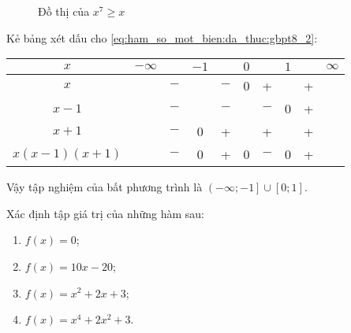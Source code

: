 {\begin{minipageindent}{0.4\textwidth}
\begin{figure}[H]
         \caption{Đồ thị của $x^7 \geq x$}
         \label{fig:ham_so_mot_bien:da_thuc:gbpt8}
      \end{figure}
   \end{minipageindent}
}

Kẻ bảng xét dấu cho \ref{eq:ham_so_mot_bien:da_thuc:gbpt8_2}:
\begin{table}[H]
   \centering
   \begin{tabular}{|c|ccccccccc|}
      \hline
      $x$           & $-\infty$ &     & $-1$ &     & $0$ &     & $1$ &   & $\infty$ \\
      \hline
      $x$           &           & $-$ &      & $-$ &  0  &  +  &     & + &           \\
      \hline
      $x-1$         &           & $-$ &      & $-$ &     & $-$ &  0  & + &           \\
      \hline
      $x+1$         &           & $-$ &  0   &  +  &     &  +  &     & + &           \\
      \hline
      $x(x-1)(x+1)$ &           & $-$ &  0   &  +  &  0  & $-$ &  0  & + &           \\
      \hline
      \end{tabular}
\end{table}

Vậy tập nghiệm của bất phương trình là $\left(-\infty; -1\right] \cup \left[0; 1\right]$.

\exercise Xác định tập giá trị của những hàm sau:
\begin{multicols}{2}
   \begin{enumerate}
      \item $f(x) = 0$;
      \item $f(x) = 10x - 20$;
      \item $f(x) = x^2 + 2x + 3$;
      \item $f(x) = x^4 + 2x^2 + 3$.
   \end{enumerate}
\end{multicols}

